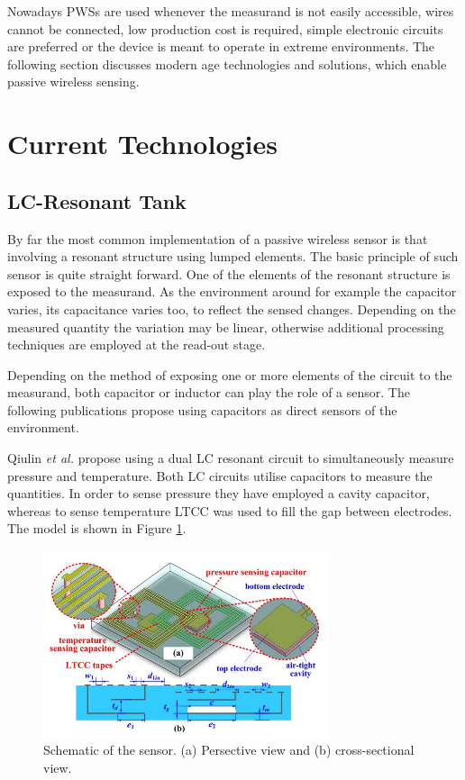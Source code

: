 \documentclass[11pt,a4paper]{article}
\begin{document}
Nowadays PWSs are used whenever the measurand is not easily accessible, wires cannot be connected, low production cost is required, simple electronic circuits are preferred or the device is meant to operate in extreme environments. The following section discusses modern age technologies and solutions, which enable passive wireless sensing.

\section{Current Technologies}

\subsection{LC-Resonant Tank}

By far the most common implementation of a passive wireless sensor is that involving a resonant structure using lumped elements. The basic principle of such sensor is quite straight forward. One of the elements of the resonant structure is exposed to the measurand. As the environment around for example the capacitor varies, its capacitance varies too, to reflect the sensed changes. Depending on the measured quantity the variation may be linear, otherwise additional processing techniques are employed at the read-out stage.

Depending on the method of exposing one or more elements of the circuit to the measurand, both capacitor or inductor can play the role of a sensor. The following publications propose using capacitors as direct sensors of the environment.

Qiulin \textit{et al.} \cite{harsh} propose using a dual LC resonant circuit to simultaneously measure pressure and temperature. Both LC circuits utilise capacitors to measure the quantities. In order to sense pressure they have employed a cavity capacitor, whereas to sense temperature LTCC \cite{LTCC} was used to fill the gap between electrodes. The model is shown in Figure \ref{fig:harsh1}.

\begin{figure}[h]
\centering
\includegraphics[width=0.75\textwidth]{harsh1.JPG}
\caption{Schematic of the sensor. (a) Persective view and (b) cross-sectional view. \cite{harsh}\label{fig:harsh1}}
\end{figure}
\end{document}
